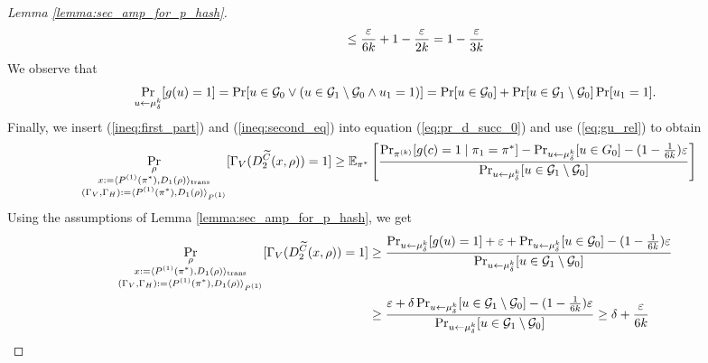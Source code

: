 \begin{proof}[Lemma \ref{lemma:sec_amp_for_p_hash}]
\begin{align}
&\mbox\qquad\qquad \leq \frac{\varepsilon}{6k} + 1 - \frac{\varepsilon}{2k} = 1 - \frac{\varepsilon}{3k}
\end{align}
We observe that
\begin{align}
  \label{eq:gu_rel}
\underset{u \leftarrow \mu_{\delta}^k}{\Pr}[g(u) = 1]
= \Pr[u \in \mathcal{G}_0 \lor ( u \in \mathcal{G}_1 \setminus \mathcal{G}_0 \land u_1 = 1)] = \Pr[u \in \mathcal{G}_0] + \Pr[u \in \mathcal{G}_1 \setminus \mathcal{G}_0] \Pr[u_1 = 1].
\end{align}
Finally, we insert (\ref{ineq:first_part}) and (\ref{ineq:second_eq}) into equation (\ref{eq:pr_d_succ_0}) and use (\ref{eq:gu_rel}) to obtain
\begin{align*}
\underset{
  \substack{\rho \\ x := \langle P^{(1)}(\pi^*), D_1(\rho) \rangle_{\text{trans}}
    \\ (\Gamma_V, \Gamma_H) := \langle P^{(1)}(\pi^*), D_1 (\rho) \rangle_{P^{(1)}} }}
{\Pr}[\Gamma_V(D_2^{\widetilde{C}}(x, \rho)) = 1]
&\geq \mathbb{E}_{\pi^*}\left[\frac{{\Pr}_{\pi^{(k)}}[g(c) = 1 \mid \pi_1 = \pi^*] -
{\Pr}_{u \leftarrow \mu_{\delta}^{k}}[u \in G_0] - (1 - \frac{1}{6k})\varepsilon} {\Pr_{u \leftarrow \mu_{\delta}^{k}}[u \in \mathcal{G}_1 \setminus \mathcal{G}_0]}\right] \notag
 \end{align*}
 Using the assumptions of Lemma \ref{lemma:sec_amp_for_p_hash}, we get
 \begin{align}
   \label{eq:proof_final}
\underset{
  \substack{\rho \\ x := \langle P^{(1)}(\pi^*), D_1(\rho) \rangle_{\text{trans}}
    \\ (\Gamma_V, \Gamma_H) := \langle P^{(1)}(\pi^*), D_1 (\rho) \rangle_{P^{(1)}} }}
{\Pr}[\Gamma_V(D_2^{\widetilde{C}}(x, \rho)) = 1]
 &\geq \frac{ {\Pr}_{u \leftarrow \mu_{\delta}^{k}}[g(u) = 1] + \varepsilon +
 \Pr_{u \leftarrow \mu_{\delta}^{k}}[u \in \mathcal{G}_0] - (1 - \frac{1}{6k})\varepsilon} {\Pr_{u \leftarrow \mu_{\delta}^{k}}[u \in \mathcal{G}_1 \setminus \mathcal{G}_0]} \notag\\
 &\geq \frac{\varepsilon + \delta\Pr_{u \leftarrow \mu_{\delta}^{k}}[u \in \mathcal{G}_1 \setminus \mathcal{G}_0] - (1 - \frac{1}{6k})\varepsilon}
{\Pr_{u \leftarrow \mu_{\delta}^{k}}[u \in \mathcal{G}_1 \setminus \mathcal{G}_0]} \geq \delta + \frac{\varepsilon}{6k}
\end{align}
\end{proof}

%
